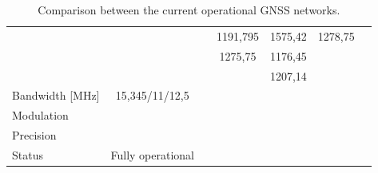 \begin{table}[!h]
\begin{tabular}{lcccccc}
                                         &                   &                              & 1191,795             & 1575,42        & 1278,75 &  \\
                                         &                   &                              & 1275,75              & 1176,45        &         &  \\
                                         &                   &                              &                      & 1207,14        &         &  \\
        Bandwidth [MHz]                  & 15,345/11/12,5    &                              &                      &                &         &  \\
        Modulation                       &                   &                              &                      &                &         &  \\
        Precision                        &                   &                              &                      &                &         &  \\
        Status                           & Fully operational &                              &                      &                &         &  \\
        \bottomrule[1.5pt]
    \end{tabular}
    \caption{Comparison between the current operational GNSS networks.}
    \label{tab:networks-comparison}
\end{table}


